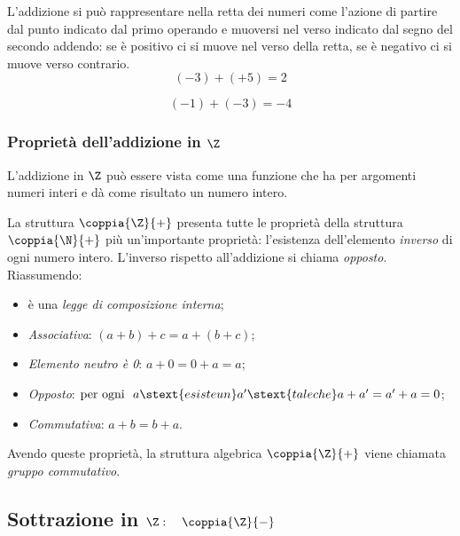 L'addizione si può rappresentare nella retta dei numeri come l'azione di 
partire dal punto indicato dal primo operando e 
muoversi nel verso indicato dal segno del secondo addendo: 
se è positivo ci si muove nel verso della retta, 
se è negativo ci si muove verso contrario.
\[(-3)+(+5)=2\]
\begin{center}
\intaddlinea

%  
\end{center}
\[ (-1)+(-3) = -4\]
\begin{center}
\intaddlineb

%  
\end{center}

\subsubsection{Proprietà dell'addizione in \(\Z\)}

L'addizione in \(\Z\) può essere vista come una funzione che ha per 
argomenti numeri interi e dà come risultato un numero intero.

La struttura \(\coppia{\Z}{+}\) presenta tutte le proprietà della struttura 
\(\coppia{\N}{+}\) più un'importante proprietà:
l'esistenza dell'elemento \emph{inverso} di ogni numero intero.
L'inverso rispetto all'addizione si chiama \emph{opposto}.
Riassumendo:
\begin{itemize} [noitemsep]
 \item è una \emph{legge di composizione interna};
 \item \emph{Associativa}: \quad \((a + b) + c = a + (b + c)\);
 \item \emph{Elemento neutro è 0}: \quad \(a + 0 = 0 + a = a\);
 \item \emph{Opposto}: \quad 
 \(\text{per ogni~ } a \stext{ esiste un } a' \stext{ tale che }
 a + a' = a' + a = 0\);
 \item \emph{Commutativa}: \quad \(a + b = b + a\).
\end{itemize}

Avendo queste proprietà, la struttura algebrica \(\coppia{\Z}{+}\) viene 
chiamata \emph{gruppo commutativo}.


\subsection{Sottrazione in $\Z: \quad \coppia{\Z}{-}$}

